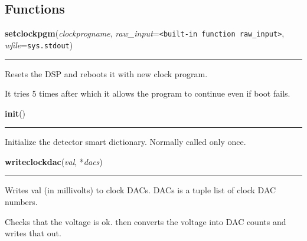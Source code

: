   \subsection{Functions}

    \label{det:setclockpgm}

    \vspace{0.5ex}

    \begin{boxedminipage}{\textwidth}

    \raggedright \textbf{setclockpgm}(\textit{clockprogname}, \textit{raw\_input}=\texttt{{\textless}built-in function raw\_input{\textgreater}}, \textit{wfile}=\texttt{sys.stdout})

    \vspace{-1.5ex}

    \rule{\textwidth}{0.5\fboxrule}
    Resets the DSP and reboots it with new clock program.

    It tries 5 times after which it allows the program to continue even if 
    boot fails.

    \vspace{1ex}

    \end{boxedminipage}

    \label{det:init}

    \vspace{0.5ex}

    \begin{boxedminipage}{\textwidth}

    \raggedright \textbf{init}()

    \vspace{-1.5ex}

    \rule{\textwidth}{0.5\fboxrule}
    Initialize the detector smart dictionary. Normally called only once.

    \vspace{1ex}

    \end{boxedminipage}

    \label{det:writeclockdac}

    \vspace{0.5ex}

    \begin{boxedminipage}{\textwidth}

    \raggedright \textbf{writeclockdac}(\textit{val}, *\textit{dacs})

    \vspace{-1.5ex}

    \rule{\textwidth}{0.5\fboxrule}
    Writes val (in millivolts) to clock DACs. DACs is a tuple list of clock
    DAC numbers.

    Checks that the voltage is ok. then converts the voltage into DAC 
    counts and writes that out.

    \vspace{1ex}

    \end{boxedminipage}

